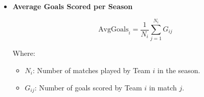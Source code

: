 \begin{itemize}
    \item  \textbf{Average Goals Scored per Season}
    
    
    \[
        \text{AvgGoals}_i = \frac{1}{N_i} \sum_{j=1}^{N_i} G_{ij}
        \label{eq:avg_goals}
    \]
    
    Where:
    \begin{itemize}
        \item $N_i$: Number of matches played by Team $i$ in the season.
        \item $G_{ij}$: Number of goals scored by Team $i$ in match $j$.
    \end{itemize}

    
\end{itemize}

